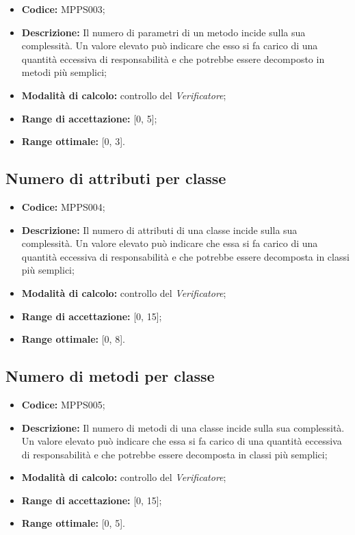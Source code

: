 \documentclass[openany,12pt,a4paper]{report}
\begin{document}
\begin{itemize}
    \item \textbf{Codice:} MPPS003;

    \item \textbf{Descrizione:} Il numero di parametri di un metodo incide sulla sua complessità. Un valore elevato può indicare che esso si fa carico di una quantità eccessiva di responsabilità e che potrebbe essere decomposto in metodi più semplici;
    
    \item \textbf{Modalità di calcolo:} controllo del \textit{Verificatore};
    
    \item \textbf{Range di accettazione:} [0, 5];
    \item \textbf{Range ottimale:} [0, 3].
\end{itemize}

\subsection{Numero di attributi per classe}

\begin{itemize}
    \item \textbf{Codice:} MPPS004;

    \item \textbf{Descrizione:} Il numero di attributi di una classe incide sulla sua complessità. Un valore elevato può indicare che essa si fa carico di una quantità eccessiva di responsabilità e che potrebbe essere decomposta in classi più semplici;
    
    \item \textbf{Modalità di calcolo:} controllo del \textit{Verificatore};
    
    \item \textbf{Range di accettazione:} [0, 15];
    \item \textbf{Range ottimale:} [0, 8].
\end{itemize}

\subsection{Numero di metodi per classe}

\begin{itemize}
    \item \textbf{Codice:} MPPS005;

    \item \textbf{Descrizione:} Il numero di metodi di una classe incide sulla sua complessità. Un valore elevato può indicare che essa si fa carico di una quantità eccessiva di responsabilità e che potrebbe essere decomposta in classi più semplici;
    
    \item \textbf{Modalità di calcolo:} controllo del \textit{Verificatore};
    
    \item \textbf{Range di accettazione:} [0, 15];
    \item \textbf{Range ottimale:} [0, 5].
\end{itemize}
\end{document}
